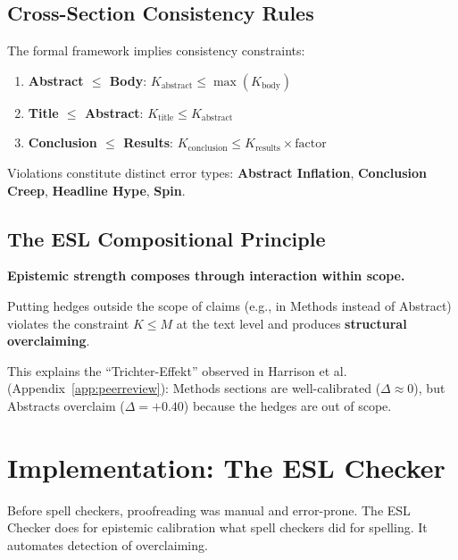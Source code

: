 \subsection{Cross-Section Consistency Rules}

The formal framework implies consistency constraints:
\begin{enumerate}
    \item \textbf{Abstract $\leq$ Body}: $K_{\text{abstract}} \leq \max(K_{\text{body}})$
    \item \textbf{Title $\leq$ Abstract}: $K_{\text{title}} \leq K_{\text{abstract}}$
    \item \textbf{Conclusion $\leq$ Results}: $K_{\text{conclusion}} \leq K_{\text{results}} \times \text{factor}$
\end{enumerate}

Violations constitute distinct error types: \textbf{Abstract Inflation}, \textbf{Conclusion Creep}, \textbf{Headline Hype}, \textbf{Spin}.


\subsection{The ESL Compositional Principle}

\begin{principlebox}[Summary]
\textbf{Epistemic strength composes through interaction within scope.}

Putting hedges outside the scope of claims (e.g., in Methods instead of Abstract) violates the constraint $K \leq M$ at the text level and produces \textbf{structural overclaiming}.

This explains the ``Trichter-Effekt'' observed in Harrison et al. (Appendix~\ref{app:peerreview}): Methods sections are well-calibrated ($\Delta \approx 0$), but Abstracts overclaim ($\Delta = +0.40$) because the hedges are out of scope.
\end{principlebox}



\section{Implementation: The ESL Checker}

\begin{analogybox}
Before spell checkers, proofreading was manual and error-prone. The ESL Checker does for epistemic calibration what spell checkers did for spelling. It automates detection of overclaiming.
\end{analogybox}


